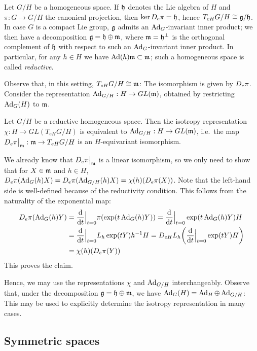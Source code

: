 Let $G/H$ be a homogeneous space. If $\mathfrak{h}$ denotes the Lie algebra of $H$ and $\pi:G\to G/H$ the canonical projection, then $\ker D_e \pi=\mathfrak{h}$, hence $T_{eH}G/H\cong \mathfrak{g}/\mathfrak{h}$. In case $G$ is a compact Lie group, $\mathfrak{g}$ admits an $\operatorname{Ad}_G$-invariant inner product; we then have a decomposition $\mathfrak{g}=\mathfrak{h}\oplus \mathfrak{m}$, where $\mathfrak{m}=\mathfrak{h}^\perp$ is the orthogonal complement of $\mathfrak{h}$ with respect to such an $\operatorname{Ad}_G$-invariant inner product. In particular, for any $h\in H$ we have $\operatorname{Ad}(h)\mathfrak{m}\subset \mathfrak{m}$; such a homogeneous space is called \emph{reductive}. 

Observe that, in this setting, $T_{eH}G/H\cong \mathfrak{m}$: The isomorphism is given by $D_e\pi$. Consider the representation $\operatorname{Ad}_{G/H}:H\to GL(\mathfrak{m})$, obtained by restricting $\operatorname{Ad}_G(H)$ to $\mathfrak{m}$.

\begin{prop}
	Let $G/H$ be a reductive homogeneous space. Then the isotropy representation $\chi:H\to GL(T_{eH}G/H)$ is equivalent to $\operatorname{Ad}_{G/H}:H\to GL(\mathfrak{m})$, i.e.~the map $D_e\pi\big|_{\mathfrak{m}}:\mathfrak{m}\to T_{eH}G/H$ is an $H$-equivariant isomorphism.
\end{prop}
\begin{myproof}
	We already know that $D_e\pi\big|_{\mathfrak{m}}$ is a linear isomorphism, so we only need to show that for $X\in\mathfrak{m}$ and $h\in H$, $D_e\pi(\operatorname{Ad}_G(h)X)=D_e\pi(\operatorname{Ad}_{G/H}(h)X)=\chi(h)(D_e\pi(X))$. Note that the left-hand side is well-defined because of the reductivity condition. This follows from the naturality of the exponential map:
	\begin{align*}
		D_e\pi(\operatorname{Ad}_G(h)Y)&=\frac{\mathrm{d} }{\mathrm{d} t}\Big|_{t=0}\pi(\exp(t\operatorname{Ad}_G(h)Y))
		=\frac{\mathrm{d} }{\mathrm{d} t}\Big|_{t=0}\exp(t\operatorname{Ad}_G(h)Y)H\\
		&=\frac{\mathrm{d} }{\mathrm{d} t}\Big|_{t=0} L_h\exp(t Y) h^{-1}H
		=D_{eH} L_h\bigg(\frac{\mathrm{d} }{\mathrm{d} t}\Big|_{t=0}\exp(tY) H\bigg)\\
		&=\chi(h)(D_e \pi(Y))
	\end{align*}
	This proves the claim.
\end{myproof}

Hence, we may use the representations $\chi$ and $\operatorname{Ad}_{G/H}$ interchangeably. Observe that, under the decomposition $\mathfrak{g}=\mathfrak{h}\oplus \mathfrak{m}$, we have $\operatorname{Ad}_G(H)=\operatorname{Ad}_H\oplus \operatorname{Ad}_{G/H}$: This may be used to explicitly determine the isotropy representation in many cases.

\subsection{Symmetric spaces}

